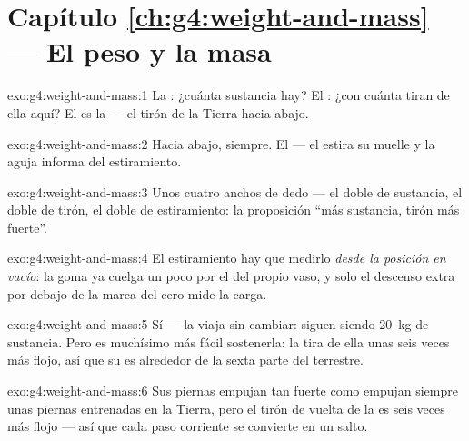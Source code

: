 \section*{Capítulo \ref{ch:g4:weight-and-mass} --- El peso y la masa}

\begin{solution}{exo:g4:weight-and-mass:1}
La : ¿cuánta sustancia hay? El : ¿con cuánta  tiran
de ella aquí? El  es la  --- el tirón de la Tierra
hacia abajo.
\end{solution}

\begin{solution}{exo:g4:weight-and-mass:2}
Hacia abajo, siempre. El  --- el  estira su muelle
y la aguja informa del estiramiento.
\end{solution}

\begin{solution}{exo:g4:weight-and-mass:3}
Unos cuatro anchos de dedo --- el doble de sustancia, el doble de
tirón, el doble de estiramiento: la proposición ``más sustancia, tirón
más fuerte''.
\end{solution}

\begin{solution}{exo:g4:weight-and-mass:4}
El estiramiento hay que medirlo \emph{desde la posición en vacío}: la
goma ya cuelga un poco por el  del propio vaso, y solo el
descenso extra por debajo de la marca del cero mide la carga.
\end{solution}

\begin{solution}{exo:g4:weight-and-mass:5}
Sí --- la  viaja sin cambiar: siguen siendo \qty{20}{kg} de
sustancia. Pero es muchísimo más fácil sostenerla: la  tira de
ella unas seis veces más flojo, así que su  es alrededor de la
sexta parte del terrestre.
\end{solution}

\begin{solution}{exo:g4:weight-and-mass:6}
Sus piernas empujan tan fuerte como empujan siempre unas piernas
entrenadas en la Tierra, pero el tirón de vuelta de la  es seis
veces más flojo --- así que cada paso corriente se convierte en un
salto.
\end{solution}

